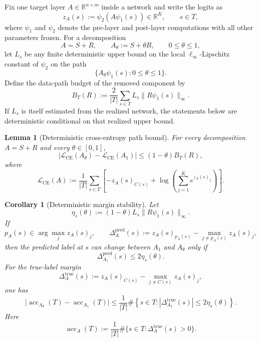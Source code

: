 \documentclass[11pt]{article}
\theoremstyle{plain}
\newtheorem{cor}[thm]{Corollary}
\newtheorem{lem}[thm]{Lemma}
\theoremstyle{definition}
\theoremstyle{remark}
\newcommand{\R}{\mathbb{R}}
\newcommand{\acc}{\operatorname{acc}}
\newcommand{\1}{\mathbf{1}}
\begin{document}
Fix one target layer \(A\in\R^{n\times m}\) inside a network and write the logits as
\[
z_A(s):=\psi_2(A\psi_1(s))\in\R^K,
\qquad s\in T,
\]
where \(\psi_1\) and \(\psi_2\) denote the pre-layer and post-layer computations with all other parameters frozen. For a decomposition
\[
A=S+R,
\qquad
A_\theta:=S+\theta R,\qquad 0\le\theta\le1,
\]
let \(L_s\) be any finite deterministic upper bound on the local \(\ell_\infty\)-Lipschitz constant of \(\psi_2\) on the path
\[
\{A_\theta\psi_1(s):0\le\theta\le1\}.
\]
Define the data-path budget of the removed component by
\begin{equation}
\label{eq:data_path_budget}
B_T(R):=
\frac{2}{|T|}\sum_{s\in T}L_s\|R\psi_1(s)\|_\infty.
\end{equation}
If \(L_s\) is itself estimated from the realized network, the statements below are deterministic conditional on that realized upper bound.

\begin{lem}[Deterministic cross-entropy path bound]
\label{lem:deterministic_ce_path_bound}
For every decomposition \(A=S+R\) and every \(\theta\in[0,1]\),
\[
\left|
\mathcal L_{\mathrm{CE}}(A_\theta)-\mathcal L_{\mathrm{CE}}(A_1)
\right|
\le
(1-\theta)B_T(R),
\]
where
\[
\mathcal L_{\mathrm{CE}}(A)
:=
\frac1{|T|}\sum_{s\in T}
\left[
-z_A(s)_{C(s)}
+\log\!\left(\sum_{j=1}^K e^{z_A(s)_j}\right)
\right].
\]
\end{lem}

\begin{cor}[Deterministic margin stability]
\label{cor:deterministic_margin_stability}
Let
\[
\eta_s(\theta):=(1-\theta)L_s\|R\psi_1(s)\|_\infty.
\]
If
\[
p_A(s)\in\arg\max_j z_A(s)_j,
\qquad
\Delta_A^{\mathrm{pred}}(s):=
z_A(s)_{p_A(s)}-\max_{j\ne p_A(s)}z_A(s)_j,
\]
then the predicted label at \(s\) can change between \(A_1\) and \(A_\theta\) only if
\[
\Delta_{A_1}^{\mathrm{pred}}(s)\le 2\eta_s(\theta).
\]
For the true-label margin
\[
\Delta_A^{\mathrm{true}}(s):=
z_A(s)_{C(s)}-\max_{j\ne C(s)}z_A(s)_j,
\]
one has
\[
\big|\acc_{A_\theta}(T)-\acc_{A_1}(T)\big|
\le
\frac1{|T|}
\#\left\{s\in T:
\left|\Delta_{A_1}^{\mathrm{true}}(s)\right|
\le 2\eta_s(\theta)
\right\}.
\]
Here
\[
\acc_A(T):=\frac1{|T|}\#\{s\in T:\Delta_A^{\mathrm{true}}(s)>0\}.
\]
\end{cor}
\end{document}
